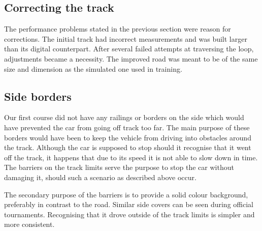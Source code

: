 \subsection{Correcting the track}
The performance problems stated in the previous section were reason for corrections. The initial track had incorrect measurements and was built larger than its digital counterpart. After several failed attempts at traversing the loop, adjustments became a necessity. The improved road was meant to be of the same size and dimension as the simulated one used in training.

\subsection{Side borders}
Our first course did not have any railings or borders on the side which would have prevented the car from going off track too far. The main purpose of these borders would have been to keep the vehicle from driving into obstacles around the track. Although the car is supposed to stop should it recognise that it went off the track, it happens that due to its speed it is not able to slow down in time. The barriers on the track limits serve the purpose to stop the car without damaging it, should such a scenario as described above occur.

The secondary purpose of the barriers is to provide a solid colour background, preferably in contrast to the road. Similar side covers can be seen during official tournaments. Recognising that it drove outside of the track limits is simpler and more consistent.
